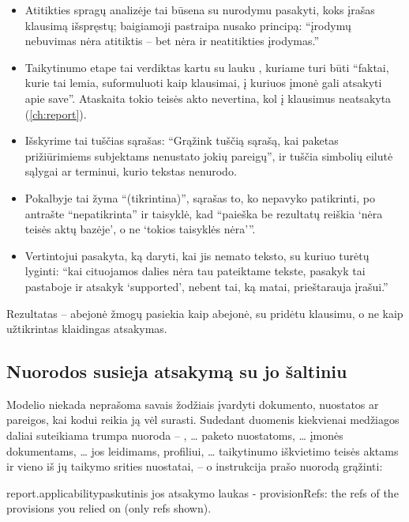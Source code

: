 \begin{itemize}
  \item Atitikties spragų analizėje tai būsena  su nurodymu pasakyti, koks
    įrašas klausimą išspręstų; baigiamoji pastraipa nusako principą: \enquote{įrodymų nebuvimas
    nėra atitiktis -- bet nėra ir neatitikties įrodymas.}
  \item Taikytinumo etape tai verdiktas  kartu su lauku
    , kuriame turi būti \enquote{faktai, kurie tai lemia, suformuluoti
    kaip klausimai, į kuriuos įmonė gali atsakyti apie save}. Ataskaita tokio teisės akto
    nevertina, kol į klausimus neatsakyta (\cref{ch:report}).
  \item Išskyrime tai tuščias sąrašas: \enquote{Grąžink tuščią sąrašą, kai paketas
    prižiūrimiems subjektams nenustato jokių pareigų}, ir tuščia simbolių eilutė sąlygai ar terminui,
    kurio tekstas nenurodo.
  \item Pokalbyje tai žyma \enquote{(tikrintina)}, sąrašas to, ko nepavyko patikrinti, po
    antrašte \enquote{nepatikrinta} ir taisyklė, kad \enquote{paieška be rezultatų reiškia
    \enquote{nėra teisės aktų bazėje}, o ne \enquote{tokios taisyklės nėra}}.
  \item Vertintojui pasakyta, ką daryti, kai jis nemato teksto, su kuriuo turėtų lyginti:
    \enquote{kai cituojamos dalies nėra tau pateiktame tekste, pasakyk tai pastaboje ir
    atsakyk \enquote{supported}, nebent tai, ką matai, prieštarauja įrašui.}
\end{itemize}

Rezultatas -- abejonė žmogų pasiekia kaip abejonė, su pridėtu klausimu, o ne kaip užtikrintas
klaidingas atsakymas.

\subsection{Nuorodos susieja atsakymą su jo šaltiniu}

Modelio niekada neprašoma savais žodžiais įvardyti dokumento, nuostatos ar pareigos, kai kodui
reikia ją vėl surasti. Sudedant duomenis kiekvienai medžiagos daliai suteikiama trumpa
nuoroda -- ,  … paketo nuostatoms,  … įmonės dokumentams,
 … jos leidimams,  profiliui,  … taikytinumo iškvietimo
teisės aktams ir  vieno iš jų taikymo srities nuostatai, -- o instrukcija prašo
nuorodą grąžinti:

\begin{promptexcerpt}{report.applicability}{paskutinis jos atsakymo laukas}
- provisionRefs: the refs of the provisions you relied on (only refs shown).
\end{promptexcerpt}


